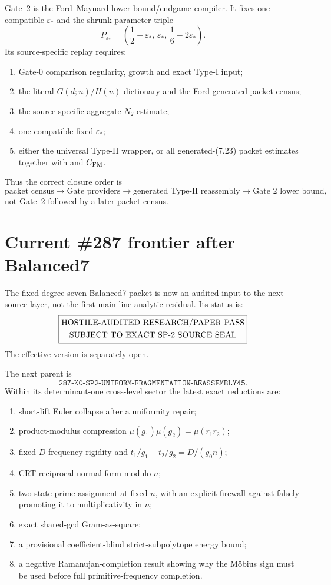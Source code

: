 \documentclass[11pt]{article}
\theoremstyle{definition}
\newcommand{\1}{\mathbf 1}
\begin{document}
Gate~2 is the Ford--Maynard lower-bound/endgame compiler.  It fixes one compatible
$\varepsilon_\ast$ and the shrunk parameter triple
\[
P_{\varepsilon_\ast}
=
\left(
\frac12-\varepsilon_\ast,\,
\varepsilon_\ast,\,
\frac16-2\varepsilon_\ast
\right).
\]
Its source-specific replay requires:
\begin{enumerate}[leftmargin=1.7em]
\item Gate-0 comparison regularity, growth and exact Type-I input;
\item the literal $G(d;n)/H(n)$ dictionary and the Ford-generated packet census;
\item the source-specific aggregate $N_2$ estimate;
\item one compatible fixed $\varepsilon_\ast$;
\item either the universal Type-II wrapper, or all generated-(7.23) packet estimates
  together with  and $C_{\rm FM}$.
\end{enumerate}
Thus the correct closure order is
\[
\text{packet census}
\to
\text{Gate providers}
\to
\text{generated Type-II reassembly}
\to
\text{Gate 2 lower bound},
\]
not Gate~2 followed by a later packet census.

\section{Current \#287 frontier after Balanced7}
\label{sec:fixed-degree-seven-ledger}

The fixed-degree-seven Balanced7 packet is now an audited input to the next source layer,
not the first main-line analytic residual.  Its status is:
\[
\boxed{\begin{gathered}
\text{\rm HOSTILE-AUDITED RESEARCH/PAPER PASS}\\
\text{\rm SUBJECT TO EXACT SP-2 SOURCE SEAL}
\end{gathered}}
\]
The effective version is separately open.

The next parent is
\[
\boxed{\texttt{287-K0-SP2-UNIFORM-FRAGMENTATION-REASSEMBLY45}}.
\]
Within its determinant-one cross-level sector the latest exact reductions are:
\begin{enumerate}[leftmargin=1.7em]
\item short-lift Euler collapse after a uniformity repair;
\item product-modulus compression $\mu(g_1)\mu(g_2)=\mu(r_1r_2)$;
\item fixed-$D$ frequency rigidity and $t_1/g_1-t_2/g_2=D/(g_0n)$;
\item CRT reciprocal normal form modulo $n$;
\item two-state prime assignment at fixed $n$, with an explicit firewall against falsely
  promoting it to multiplicativity in $n$;
\item exact shared-gcd Gram-as-square;
\item a provisional coefficient-blind strict-subpolytope energy bound;
\item a negative Ramanujan-completion result showing why the M\"obius sign must be used
  before full primitive-frequency completion.
\end{enumerate}
\end{document}
